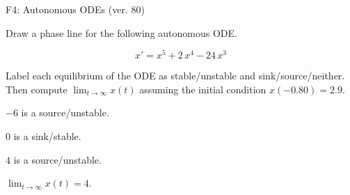 \begin{exercise}
  \begin{exerciseTitle}F4: Autonomous ODEs (ver. 80)\end{exerciseTitle}
  \begin{exerciseStatement}
    

      Draw a phase line for the following 
      autonomous ODE.
    

    
\[x'= x^{5} + 2 \, x^{4} - 24 \, x^{3}\]

    

      Label each equilibrium of the ODE
      as stable/unstable and sink/source/neither.
      Then compute \(\lim_{t\to\infty}x(t)\)
      assuming the initial condition
      \(x( -0.80 )= 2.9\).
    

  \end{exerciseStatement}
  \begin{exerciseAnswer}
    

      \(-6\) is a source/unstable.
      
        \(0\) is a sink/stable.
      
      \(4\) is a source/unstable.
    

    

      \(\lim_{t\to\infty}x(t)=4\).
    

  \end{exerciseAnswer}
\end{exercise}